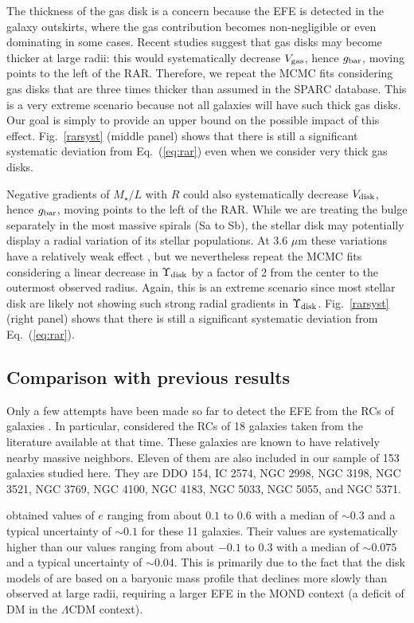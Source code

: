 \documentclass[twocolumn,tighten]{aastex63}
\begin{document}
The thickness of the gas disk is a concern because the EFE is detected in the galaxy outskirts, where the gas contribution becomes non-negligible or even dominating in some cases. Recent studies \citep{Bac19} suggest that gas disks may become thicker at large radii: this would systematically decrease $V_{\rm gas}$, hence $g_{\rm bar}$, moving points to the left of the RAR. Therefore, we repeat the MCMC fits considering gas disks that are three times thicker than assumed in the SPARC database. This is a very extreme scenario because not all galaxies will have such thick gas disks. Our goal is simply to provide an upper bound on the possible impact of this effect. Fig.~\ref{rarsyst} (middle panel) shows that there is still a significant systematic deviation from Eq.~(\ref{eq:rar}) even when we consider very thick gas disks.

Negative gradients of $M_\star/L$ with $R$ could also systematically decrease $V_{\rm disk}$, hence $g_{\rm bar}$, moving points to the left of the RAR. While we are treating the bulge separately in the most massive spirals (Sa to Sb), the stellar disk may potentially display a radial variation of its stellar populations. At 3.6 $\mu$m these variations have a relatively weak effect \citep{Schom19}, but we nevertheless repeat the MCMC fits considering a linear decrease in $\Upsilon_{\rm disk}$ by a factor of 2 from the center to the outermost observed radius. Again, this is an extreme scenario since most stellar disk are likely not showing such strong radial gradients in $\Upsilon_{\rm disk}$. Fig.~\ref{rarsyst} (right panel) shows that there is still a significant systematic deviation from Eq.~(\ref{eq:rar}).

\subsection{Comparison with previous results}
Only a few attempts have been made so far to detect the EFE from the RCs of galaxies \citep{Hag16,WK15}. In particular, \cite{Hag16} considered the RCs of 18 galaxies taken from the literature available at that time. These galaxies are known to have relatively nearby massive neighbors. Eleven of them are also included in our sample of 153 galaxies studied here. They are DDO 154, IC 2574, NGC 2998, NGC 3198, NGC 3521, NGC 3769, NGC 4100, NGC 4183, NGC 5033, NGC 5055, and NGC 5371.

\cite{Hag16} obtained values of $e$ ranging from about $0.1$ to $0.6$ with a median of $\sim 0.3$ and a typical uncertainty of $\sim 0.1$ for these 11 galaxies. Their values are systematically higher than our values ranging from about $ -0.1$ to $0.3$ with a median of $\sim 0.075$ and a typical uncertainty of $\sim 0.04$. This is primarily due to the fact that the disk models of \cite{Hag16} are based on a baryonic mass profile that declines more slowly than observed at large radii, requiring a larger EFE in the MOND context (a deficit of DM in the $\Lambda$CDM context).
\end{document}
